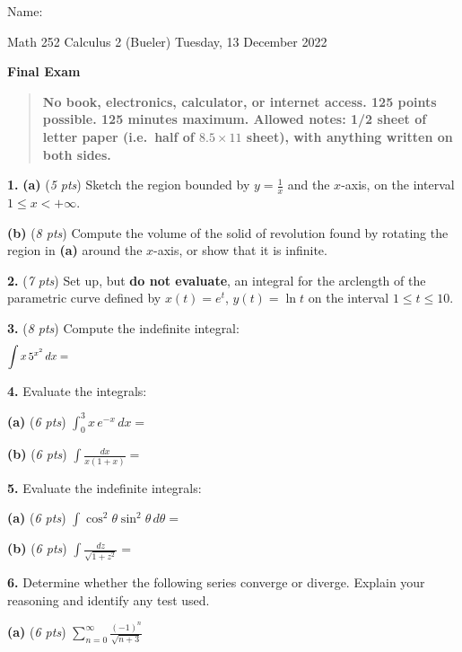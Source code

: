 \documentclass[11pt]{amsart}
\newcommand{\ds}{\displaystyle}
\newcommand{\prob}[1]{\bigskip\noindent\textbf{#1.} }
\newcommand{\pts}[1]{(\emph{#1 pts})}
\newcommand{\probpts}[2]{\prob{#1} \pts{#2} \quad}
\newcommand{\ppartpts}[2]{\textbf{(#1)} \pts{#2} \quad}
\newcommand{\epartpts}[2]{\medskip\noindent \textbf{(#1)} \pts{#2} \quad}
\begin{document}
\hfill \Large Name:\underline{\phantom{Ed Bueler really really long long long name}}
\medskip

\scriptsize \noindent Math 252 Calculus 2 (Bueler) \hfill Tuesday, 13 December 2022 %
\medskip

\LARGE\centerline{\textbf{Final Exam}}

\smallskip
\begin{quote}
\large
\textbf{No book, electronics, calculator, or internet access.  125 points possible.  125 minutes maximum.  Allowed notes: 1/2 sheet of letter paper (i.e.~half of $8.5\times 11$ sheet), with anything written on both sides.}
\end{quote}

\normalsize
\medskip

\thispagestyle{empty}

\prob{1}  \ppartpts{a}{5} Sketch the region bounded by $\displaystyle y=\frac{1}{x}$ and the $x$-axis, on the interval $1 \le x < +\infty$.
\vfill

\epartpts{b}{8} Compute the volume of the solid of revolution found by rotating the region in \textbf{(a)} around the $x$-axis, or show that it is infinite.
\vfill

\clearpage\newpage
\probpts{2}{7}  Set up, but \textbf{do not evaluate}, an integral for the arclength of the parametric curve defined by $\displaystyle x(t) = e^t$, $y(t) = \ln t$ on the interval $1\leq t\le 10$.
\vfill

\probpts{3}{8}  Compute the indefinite integral:
\large
    $$\int x \,5^{x^2}\,dx = \hspace{5.0in}$$
\normalsize
\vfill


\clearpage\newpage
\prob{4}  Evaluate the integrals:

\epartpts{a}{6} $\ds  \int_0^3 x\, e^{-x}\,dx =$
\vfill

\epartpts{b}{6} $\ds  \int \frac{dx}{x(1+x)} =$
\vfill

\clearpage\newpage
\prob{5}  Evaluate the indefinite integrals:

\epartpts{a}{6} $\ds  \int \cos^2 \theta \sin^2\theta\,d\theta =$
\vfill

\epartpts{b}{6} $\ds  \int \frac{dz}{\sqrt{1+z^2}} =$
\vfill


\clearpage\newpage
\prob{6}  Determine whether the following series converge or diverge. Explain your reasoning and identify any test used.

\epartpts{a}{6}  $\ds \sum_{n = 0}^\infty \frac{(-1)^n}{\sqrt{n+3}}$
\vfill
\end{document}
